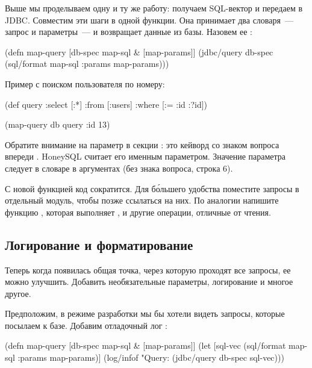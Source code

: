 Выше мы проделываем одну и ту же работу: получаем SQL-вектор и передаем в JDBC. Совместим эти шаги в одной функции. Она принимает два словаря~--- запрос и параметры~--- и возвращает данные из базы. Назовем ее :

\begin{english}
  \begin{clojure/lines}
(defn map-query
  [db-spec map-sql & [map-params]]
  (jdbc/query db-spec
              (sql/format map-sql
                          {:params map-params})))
  \end{clojure/lines}
\end{english}

Пример с поиском пользователя по номеру:

\begin{english}
  \begin{clojure}
(def query
  {:select [:*]
   :from [:users]
   :where [:= :id :?id]})

(map-query db query {:id 13})
  \end{clojure}
\end{english}

Обратите внимание на параметр  в секции : это кейворд со знаком вопроса впереди . HoneySQL считает его именным параметром. Значение параметра следует в словаре  в аргументах  (без знака вопроса, строка 6).

С новой функцией код сократится. Для б\'{о}льшего удобства поместите запросы в отдельный модуль, чтобы позже ссылаться на них. По аналогии напишите функцию , которая выполняет ,  и другие операции, отличные от чтения.

\subsection{Логирование и форматирование}


Теперь когда появилась общая точка, через которую проходят все запросы, ее можно улучшить. Добавить необязательные параметры, логирование и многое другое.

Предположим, в режиме разработки мы бы хотели видеть запросы, которые посылаем к базе. Добавим отладочный лог :

\begin{english}
  \begin{clojure/lines}
(defn map-query [db-spec map-sql & [map-params]]
  (let [sql-vec
        (sql/format map-sql {:params map-params})]
    (log/infof "Query: %
    (jdbc/query db-spec sql-vec)))
  \end{clojure/lines}
\end{english}

